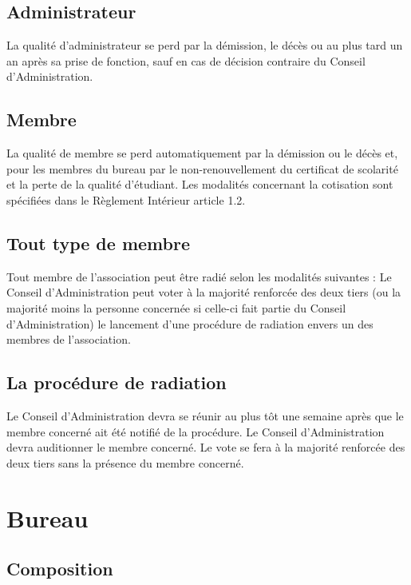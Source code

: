 \documentclass[12pt]{article}
\begin{document}
\subsection{Administrateur}
\label{sec:radiation:admin}

La qualité d’administrateur se perd par la démission, le décès ou au plus tard un an après sa prise de fonction,
sauf en cas de décision contraire du Conseil d’Administration.

\subsection{Membre}
\label{sec:radiation:membre}

La qualité de membre se perd automatiquement par la démission ou le décès et, pour les membres du bureau
par le non-renouvellement du certificat de scolarité et la perte de la qualité d’étudiant. Les modalités
concernant la cotisation sont spécifiées dans le Règlement Intérieur article 1.2.

\subsection{Tout type de membre}
\label{sec:radiation:toutmembre}
Tout membre de l’association peut être radié selon les modalités suivantes :
Le Conseil d’Administration peut voter à la majorité renforcée des deux tiers (ou la majorité moins la personne
concernée si celle-ci fait partie du Conseil d’Administration) le lancement d’une procédure de radiation envers
un des membres de l’association.

\subsection{La procédure de radiation}
\label{sec:radiation:procedure}

Le Conseil d’Administration devra se réunir au plus tôt une semaine après que le membre concerné ait été
notifié de la procédure. Le Conseil d’Administration devra auditionner le membre concerné. Le vote se fera à
la majorité renforcée des deux tiers sans la présence du membre concerné.


\section{Bureau}
\label{sec:bureau}

\subsection{Composition}
\label{sec:bureau:composition}
\end{document}
